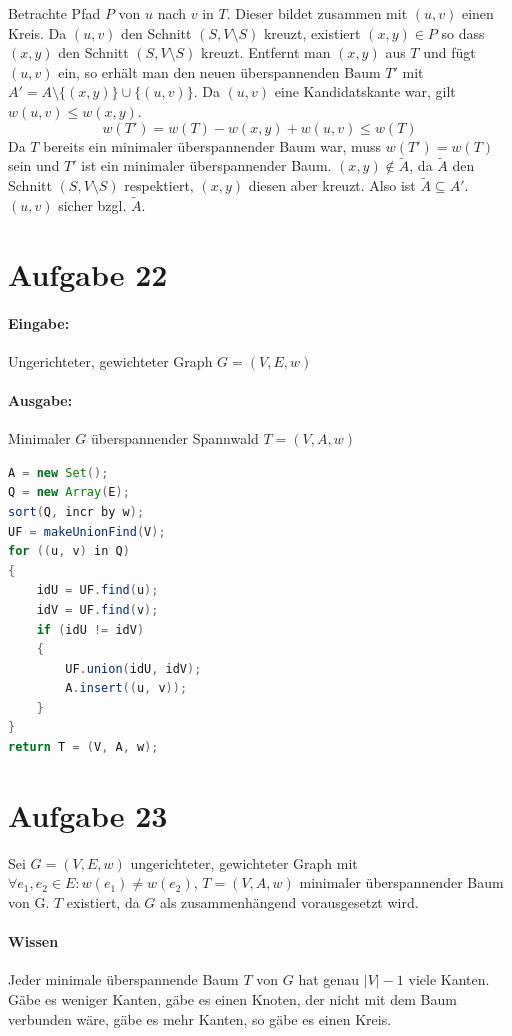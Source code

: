 \documentclass[10pt,a4paper]{article}
\begin{document}
	Betrachte Pfad $P$ von $u$ nach $v$ in $T$. Dieser bildet zusammen mit $(u, v)$ einen Kreis.
	Da $(u,v)$ den Schnitt $(S, V \setminus S)$ kreuzt, existiert $(x, y) \in P$ so dass $(x, y)$ den Schnitt $(S, V \setminus S)$ kreuzt.
	Entfernt man $(x,y)$ aus $T$ und fügt $(u,v)$ ein, so erhält man den neuen überspannenden Baum $T'$
	mit $A' = A \setminus \{(x, y)\} \cup \{(u, v)\}$.
	Da $(u, v)$ eine Kandidatskante war, gilt $w(u,v) \leq w(x, y)$.
	\begin{equation*}
	w(T') = w(T) - w(x, y) + w(u,v) \leq w(T)
	\end{equation*}
	Da $T$ bereits ein minimaler überspannender Baum war, muss $w(T') = w(T)$ sein und $T'$ ist ein minimaler überspannender Baum.
	$(x, y) \notin \tilde{A}$, da $\tilde{A}$ den Schnitt $(S, V \setminus S)$ respektiert, $(x, y)$ diesen aber kreuzt.
	Also ist $\tilde{A} \subseteq A'$. $(u, v)$ sicher bzgl. $\tilde{A}$.

\section*{Aufgabe 22}
	\paragraph{Eingabe:} Ungerichteter, gewichteter Graph $G=(V, E, w)$
	\paragraph{Ausgabe:} Minimaler $G$ überspannender Spannwald $T=(V, A, w)$
	\begin{lstlisting}[language=Java]
A = new Set();
Q = new Array(E);
sort(Q, incr by w);
UF = makeUnionFind(V);
for ((u, v) in Q)
{
	idU = UF.find(u);
	idV = UF.find(v);
	if (idU != idV)
	{
		UF.union(idU, idV);
		A.insert((u, v));
	}
}
return T = (V, A, w);
	\end{lstlisting}


\section*{Aufgabe 23}
Sei $G = (V, E, w)$ ungerichteter, gewichteter Graph mit $\forall e_1, e_2 \in E : w(e_1) \neq w(e_2)$, $T = (V, A, w)$ minimaler überspannender Baum von G. $T$ existiert, da $G$ als zusammenhängend vorausgesetzt wird.
\paragraph{Wissen} Jeder minimale überspannende Baum $T$ von $G$ hat genau $|V|-1$ viele Kanten. Gäbe es weniger Kanten, gäbe es einen Knoten, der nicht mit dem Baum verbunden wäre, gäbe es mehr Kanten, so gäbe es einen Kreis.
\end{document}
